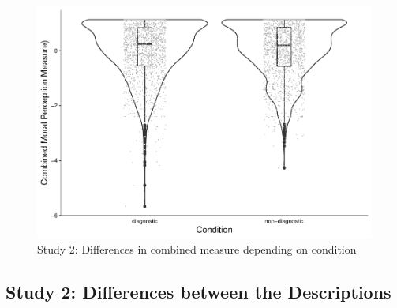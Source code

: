 \documentclass[
  american,
  man,floatsintext]{apa7}
\begin{document}
\begin{figure}[!h]
\includegraphics[width=\textwidth,]{Supplementary_files/figure-latex/S3combinedconditionplot-1} \caption{Study 2: Differences in combined measure depending on condition}\label{fig:S3combinedconditionplot}
\end{figure}

\newpage

\hypertarget{study-2-differences-between-the-descriptions}{%
\subsection{Study 2: Differences between the Descriptions}\label{study-2-differences-between-the-descriptions}}

\newpage
\end{document}
